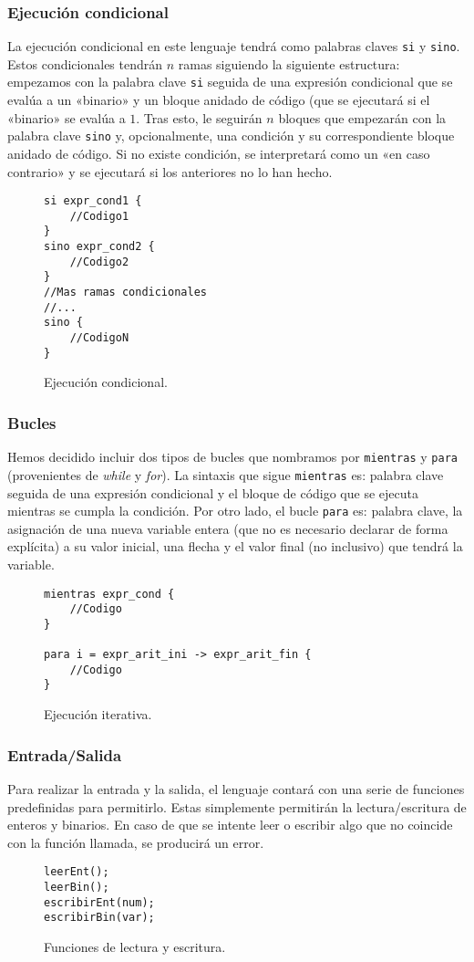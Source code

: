 \subsubsection{Ejecución condicional}
La ejecución condicional en este lenguaje tendrá como palabras claves \lstinline{si} y
\lstinline{sino}. Estos condicionales tendrán $n$ ramas siguiendo la siguiente estructura:
empezamos con la palabra clave \lstinline{si} seguida de una expresión condicional que se
evalúa a un «binario» y un bloque anidado de código (que se ejecutará si el
«binario» se evalúa a $1$. Tras esto, le seguirán $n$ bloques que empezarán con
la palabra clave \lstinline{sino} y, opcionalmente, una condición y su correspondiente
bloque anidado de código. Si no existe condición, se interpretará como un «en
caso contrario» y se ejecutará si los anteriores no lo han hecho.
\begin{figure}[htbp]
    \centering
    \begin{lstlisting}
si expr_cond1 {
    //Codigo1
}
sino expr_cond2 {
    //Codigo2
} 
//Mas ramas condicionales
//...
sino {
    //CodigoN
}
    \end{lstlisting}
    \caption{Ejecución condicional.}
\end{figure}

\subsubsection{Bucles}
Hemos decidido incluir dos tipos de bucles que nombramos por
\lstinline{mientras} y \lstinline{para}
(provenientes de \textit{while} y \textit{for}). La sintaxis que sigue
\lstinline{mientras} es: palabra clave seguida de una expresión condicional y el bloque de
código que se ejecuta mientras se cumpla la condición. Por otro lado, el bucle
\lstinline{para} es: palabra clave, la asignación de una nueva variable entera (que no es
necesario declarar de forma explícita) a su valor inicial, una flecha y el valor
final (no inclusivo) que tendrá la variable.
\begin{figure}[htbp]
    \centering
    \begin{lstlisting}
mientras expr_cond {
    //Codigo
}

para i = expr_arit_ini -> expr_arit_fin {
    //Codigo
}
    \end{lstlisting}
    \caption{Ejecución iterativa.}
\end{figure}

\subsubsection{Entrada/Salida}
Para realizar la entrada y la salida, el lenguaje contará con una serie de
funciones predefinidas para permitirlo. Estas simplemente permitirán la
lectura/escritura de enteros y binarios. En caso de que se intente leer o
escribir algo que no coincide con la función llamada, se producirá un error.
\begin{figure}[htbp]
    \centering
    \begin{lstlisting}
leerEnt();
leerBin();
escribirEnt(num);
escribirBin(var);
    \end{lstlisting}
    \caption{Funciones de lectura y escritura.}
\end{figure}

